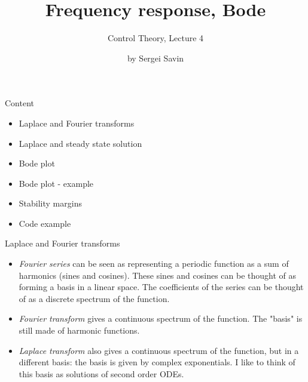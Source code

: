 \documentclass{beamer}
\title{Frequency response, Bode}
\subtitle{Control Theory, Lecture 4}
\author{by Sergei Savin}
\date{\mydate}
\begin{document}
\maketitle


\begin{frame}{Content}

\begin{itemize}
\item Laplace and Fourier transforms
\item Laplace and steady state solution
\item Bode plot
\item Bode plot - example
\item Stability margins
\item Code example
\end{itemize}

\end{frame}



\begin{frame}{Laplace and Fourier transforms}
\begin{flushleft}

\begin{itemize}
    \item \emph{Fourier series} can be seen as representing a periodic function as a sum of harmonics (sines and cosines). These sines and cosines can be thought of as forming a basis in a linear space. The coefficients of the series can be thought of as a discrete spectrum of the function.
    
    \item \emph{Fourier transform} gives a continuous spectrum of the function. The "basis" is still made of harmonic functions.
    
    \item \emph{Laplace transform} also gives a continuous spectrum of the function, but in a different basis: the basis is given by complex exponentials. I like to think of this basis as solutions of second order ODEs.
\end{itemize}

\end{flushleft}
\end{frame}
\end{document}
